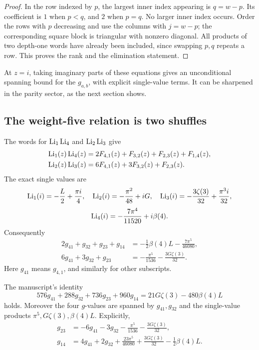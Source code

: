 \begin{proof}
In the row indexed by \(p\), the largest inner index appearing is
\(q=w-p\). Its coefficient is \(1\) when \(p<q\), and \(2\)
when \(p=q\). No larger inner index occurs.
Order the rows with \(p\) decreasing and use the columns with
\(j=w-p\); the corresponding square block is triangular with nonzero
diagonal. All products of two depth-one words have already been included,
since swapping \(p,q\) repeats a row. This proves the rank and the
elimination statement.
\end{proof}

At \(z=i\), taking imaginary parts of these equations gives an
unconditional spanning bound for the \(g_{a,b}\), with explicit
single-value terms. It can be sharpened in the parity sector, as the
next section shows.

\subsection{The weight-five relation is two shuffles}

The words for \(\operatorname{Li}_1\operatorname{Li}_4\) and \(\operatorname{Li}_2\operatorname{Li}_3\) give
\begin{align}
\operatorname{Li}_1(z)\operatorname{Li}_4(z)
&=2F_{4,1}(z)+F_{3,2}(z)+F_{2,3}(z)+F_{1,4}(z),
\label{eq:shuffle14}\\
\operatorname{Li}_2(z)\operatorname{Li}_3(z)
&=6F_{4,1}(z)+3F_{3,2}(z)+F_{2,3}(z).
\label{eq:shuffle23}
\end{align}
The exact single values are
\[
\operatorname{Li}_1(i)=-\frac L2+\frac{\pi i}{4},\quad
\operatorname{Li}_2(i)=-\frac{\pi^2}{48}+iG,\quad
\operatorname{Li}_3(i)=-\frac{3\zeta(3)}{32}+\frac{\pi^3i}{32},
\]
\[
\operatorname{Li}_4(i)=-\frac{7\pi^4}{11520}+i\beta(4).
\]
Consequently
\begin{align}
2g_{41}+g_{32}+g_{23}+g_{14}
&=-\frac12\beta(4)L-\frac{7\pi^5}{46080},
\label{eq:wt5-first}\\
6g_{41}+3g_{32}+g_{23}
&=-\frac{\pi^5}{1536}-\frac{3G\zeta(3)}{32}.
\label{eq:wt5-second}
\end{align}
Here \(g_{41}\) means \(g_{4,1}\), and similarly for other subscripts.

\begin{corollary}
\label{cor:wt5}
The manuscript's identity
\[
576g_{41}+288g_{32}+736g_{23}+960g_{14}
=21G\zeta(3)-480\beta(4)L
\]
holds. Moreover the four \(g\)-values are spanned by \(g_{41},g_{32}\)
and the single-value products \(\pi^5,G\zeta(3),\beta(4)L\).
Explicitly,
\begin{align}
g_{23}
&=-6g_{41}-3g_{32}-\frac{\pi^5}{1536}
  -\frac{3G\zeta(3)}{32},\label{eq:g23-elim}\\
g_{14}
&=4g_{41}+2g_{32}+\frac{23\pi^5}{46080}
  +\frac{3G\zeta(3)}{32}-\frac12\beta(4)L.
\label{eq:g14-elim}
\end{align}
\end{corollary}

